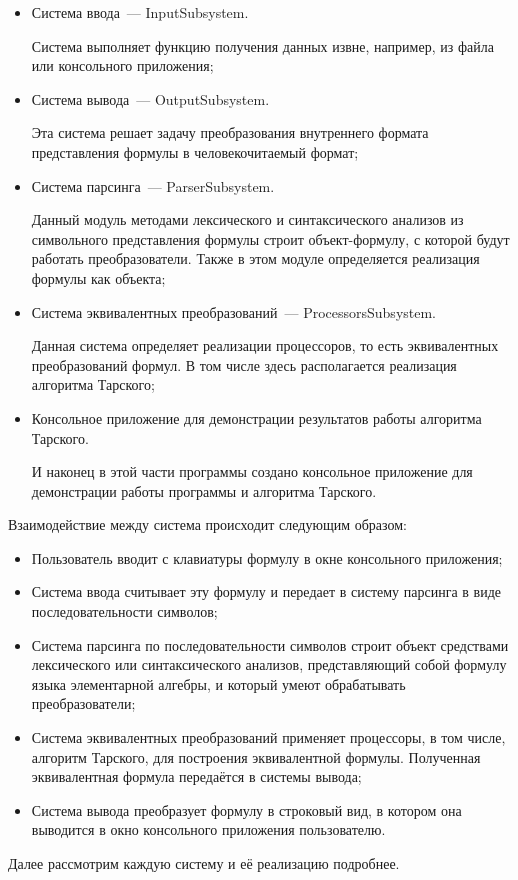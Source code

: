 \begin{itemize}
    \item Система ввода~--- InputSubsystem. 
    
    Система выполняет функцию получения данных извне, например, из файла или консольного приложения;

    \item Система вывода~--- OutputSubsystem.

    Эта система решает задачу преобразования внутреннего формата представления формулы в человекочитаемый формат;

    \item Система парсинга~--- ParserSubsystem.
    
    Данный модуль методами лексического и синтаксического анализов из символьного представления формулы строит объект-формулу, с которой будут работать преобразователи. Также в этом модуле определяется реализация формулы как объекта; 

    \item Система эквивалентных преобразований~--- ProcessorsSubsystem.
    
    Данная система определяет реализации процессоров, то есть эквивалентных преобразований формул. В том числе здесь располагается реализация алгоритма Тарского;

    \item Консольное приложение для демонстрации результатов работы алгоритма Тарского.
    
    И наконец в этой части программы создано консольное приложение для демонстрации работы программы и алгоритма Тарского.

\end{itemize}
Взаимодействие между система происходит следующим образом:
\begin{itemize}
    \item Пользователь вводит с клавиатуры формулу в окне консольного приложения;
    \item Система ввода считывает эту формулу и передает в систему парсинга в виде последовательности символов;
    \item Система парсинга по последовательности символов строит объект средствами лексического или синтаксического анализов, представляющий собой формулу языка элементарной алгебры, и который умеют обрабатывать преобразователи;
    \item Система эквивалентных преобразований применяет процессоры, в том числе, алгоритм Тарского, для построения эквивалентной формулы. Полученная эквивалентная формула передаётся в системы вывода;
    \item Система вывода преобразует формулу в строковый вид, в котором она выводится в окно консольного приложения пользователю.
\end{itemize}
Далее рассмотрим каждую систему и её реализацию подробнее. 

